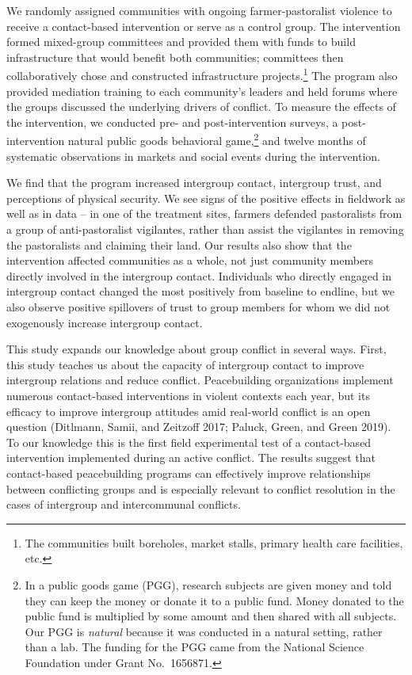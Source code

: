 \documentclass[11pt]{article}
\begin{document}
We randomly assigned communities with ongoing farmer-pastoralist
violence to receive a contact-based intervention or serve as a control
group. The intervention formed mixed-group committees and provided them
with funds to build infrastructure that would benefit both communities;
committees then collaboratively chose and constructed infrastructure
projects.\footnote{The communities built boreholes, market stalls,
  primary health care facilities, etc.} The program also provided
mediation training to each community's leaders and held forums where the
groups discussed the underlying drivers of conflict. To measure the
effects of the intervention, we conducted pre- and post-intervention
surveys, a post-intervention natural public goods behavioral
game,\footnote{In a public goods game (PGG), research subjects are given
  money and told they can keep the money or donate it to a public fund.
  Money donated to the public fund is multiplied by some amount and then
  shared with all subjects. Our PGG is \emph{natural} because it was
  conducted in a natural setting, rather than a lab. The funding for the
  PGG came from the National Science Foundation under Grant No.~1656871.}
and twelve months of systematic observations in markets and social
events during the intervention.

We find that the program increased intergroup contact, intergroup trust,
and perceptions of physical security. We see signs of the positive
effects in fieldwork as well as in data -- in one of the treatment
sites, farmers defended pastoralists from a group of anti-pastoralist
vigilantes, rather than assist the vigilantes in removing the
pastoralists and claiming their land. Our results also show that the
intervention affected communities as a whole, not just community members
directly involved in the intergroup contact. Individuals who directly
engaged in intergroup contact changed the most positively from baseline
to endline, but we also observe positive spillovers of trust to group
members for whom we did not exogenously increase intergroup contact.

This study expands our knowledge about group conflict in several ways.
First, this study teaches us about the capacity of intergroup contact to
improve intergroup relations and reduce conflict. Peacebuilding
organizations implement numerous contact-based interventions in violent
contexts each year, but its efficacy to improve intergroup attitudes
amid real-world conflict is an open question (Ditlmann, Samii, and
Zeitzoff 2017; Paluck, Green, and Green 2019). To our knowledge this is
the first field experimental test of a contact-based intervention
implemented during an active conflict. The results suggest that
contact-based peacebuilding programs can effectively improve
relationships between conflicting groups and is especially relevant to
conflict resolution in the cases of intergroup and intercommunal
conflicts.
\end{document}
